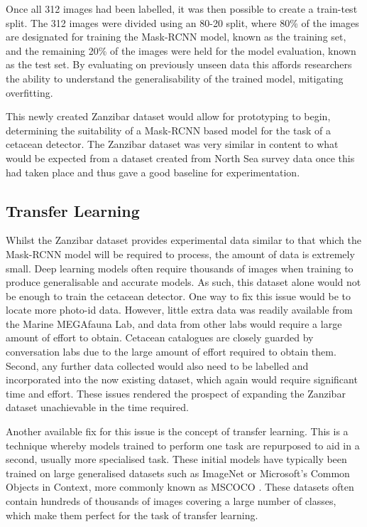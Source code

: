 Once all 312 images had been labelled, it was then possible to create a train-test split. The 312 images were divided using an 80-20 split, where 80\% of the images are designated for training the Mask-RCNN model, known as the training set, and the remaining 20\% of the images were held for the model evaluation, known as the test set. By evaluating on previously unseen data this affords researchers the ability to understand the generalisability of the trained model, mitigating overfitting. 

This newly created Zanzibar dataset would allow for prototyping to begin, determining the suitability of a Mask-RCNN based model for the task of a cetacean detector. The Zanzibar dataset was very similar in content to what would be expected from a dataset created from North Sea survey data once this had taken place and thus gave a good baseline for experimentation. 

\subsection{Transfer Learning}\label{ch:cetDet,sec:initialTesting,sub:transferLearning}

Whilst the Zanzibar dataset provides experimental data similar to that which the Mask-RCNN model will be required to process, the amount of data is extremely small. Deep learning models often require thousands of images when training to produce generalisable and accurate models. As such, this dataset alone would not be enough to train the cetacean detector. One way to fix this issue would be to locate more photo-id data. However, little extra data was readily available from the Marine MEGAfauna Lab, and data from other labs would require a large amount of effort to obtain. Cetacean catalogues are closely guarded by conversation labs due to the large amount of effort required to obtain them. Second, any further data collected would also need to be labelled and incorporated into the now existing dataset, which again would require significant time and effort. These issues rendered the prospect of expanding the Zanzibar dataset unachievable in the time required. 

Another available fix for this issue is the concept of transfer learning. This is a technique whereby models trained to perform one task are repurposed to aid in a second, usually more specialised task. These initial models have typically been trained on large generalised datasets such as ImageNet \cite{deng_imagenet:_2009} or Microsoft's Common Objects in Context, more commonly known as MSCOCO \cite{lin_microsoft_2014}. These datasets often contain hundreds of thousands of images covering a large number of classes, which make them perfect for the task of transfer learning. 

